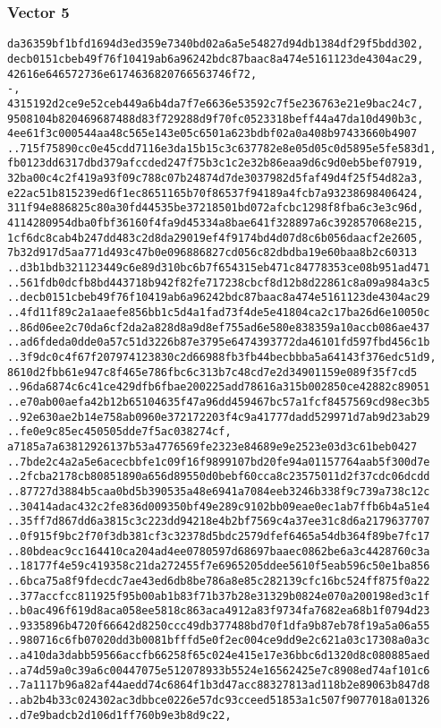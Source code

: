 \documentclass[
]{article}
\begin{document}
\hypertarget{vector-5-2}{%
\subsubsection{Vector 5}\label{vector-5-2}}

\begin{verbatim}
da36359bf1bfd1694d3ed359e7340bd02a6a5e54827d94db1384df29f5bdd302,
decb0151cbeb49f76f10419ab6a96242bdc87baac8a474e5161123de4304ac29,
42616e646572736e6174636820766563746f72,
-,
4315192d2ce9e52ceb449a6b4da7f7e6636e53592c7f5e236763e21e9bac24c7,
9508104b820469687488d83f729288d9f70fc0523318beff44a47da10d490b3c,
4ee61f3c000544aa48c565e143e05c6501a623bdbf02a0a408b97433660b4907
..715f75890cc0e45cdd7116e3da15b15c3c637782e8e05d05c0d5895e5fe583d1,
fb0123dd6317dbd379afccded247f75b3c1c2e32b86eaa9d6c9d0eb5bef07919,
32ba00c4c2f419a93f09c788c07b24874d7de3037982d5faf49d4f25f54d82a3,
e22ac51b815239ed6f1ec8651165b70f86537f94189a4fcb7a93238698406424,
311f94e886825c80a30fd44535be37218501bd072afcbc1298f8fba6c3e3c96d,
4114280954dba0fbf36160f4fa9d45334a8bae641f328897a6c392857068e215,
1cf6dc8cab4b247dd483c2d8da29019ef4f9174bd4d07d8c6b056daacf2e2605,
7b32d917d5aa771d493c47b0e096886827cd056c82dbdba19e60baa8b2c60313
..d3b1bdb321123449c6e89d310bc6b7f654315eb471c84778353ce08b951ad471
..561fdb0dcfb8bd443718b942f82fe717238cbcf8d12b8d22861c8a09a984a3c5
..decb0151cbeb49f76f10419ab6a96242bdc87baac8a474e5161123de4304ac29
..4fd11f89c2a1aaefe856bb1c5d4a1fad73f4de5e41804ca2c17ba26d6e10050c
..86d06ee2c70da6cf2da2a828d8a9d8ef755ad6e580e838359a10accb086ae437
..ad6fdeda0dde0a57c51d3226b87e3795e6474393772da46101fd597fbd456c1b
..3f9dc0c4f67f207974123830c2d66988fb3fb44becbbba5a64143f376edc51d9,
8610d2fbb61e947c8f465e786fbc6c313b7c48cd7e2d34901159e089f35f7cd5
..96da6874c6c41ce429dfb6fbae200225add78616a315b002850ce42882c89051
..e70ab00aefa42b12b65104635f47a96dd459467bc57a1fcf8457569cd98ec3b5
..92e630ae2b14e758ab0960e372172203f4c9a41777dadd529971d7ab9d23ab29
..fe0e9c85ec450505dde7f5ac038274cf,
a7185a7a63812926137b53a4776569fe2323e84689e9e2523e03d3c61beb0427
..7bde2c4a2a5e6acecbbfe1c09f16f9899107bd20fe94a01157764aab5f300d7e
..2fcba2178cb80851890a656d89550d0bebf60cca8c23575011d2f37cdc06dcdd
..87727d3884b5caa0bd5b390535a48e6941a7084eeb3246b338f9c739a738c12c
..30414adac432c2fe836d009350bf49e289c9102bb09eae0ec1ab7ffb6b4a51e4
..35ff7d867dd6a3815c3c223dd94218e4b2bf7569c4a37ee31c8d6a2179637707
..0f915f9bc2f70f3db381cf3c32378d5bdc2579dfef6465a54db364f89be7fc17
..80bdeac9cc164410ca204ad4ee0780597d68697baaec0862be6a3c4428760c3a
..18177f4e59c419358c21da272455f7e6965205ddee5610f5eab596c50e1ba856
..6bca75a8f9fdecdc7ae43ed6db8be786a8e85c282139cfc16bc524ff875f0a22
..377accfcc811925f95b00ab1b83f71b37b28e31329b0824e070a200198ed3c1f
..b0ac496f619d8aca058ee5818c863aca4912a83f9734fa7682ea68b1f0794d23
..9335896b4720f66642d8250ccc49db377488bd70f1dfa9b87eb78f19a5a06a55
..980716c6fb07020dd3b0081bfffd5e0f2ec004ce9dd9e2c621a03c17308a0a3c
..a410da3dabb59566accfb66258f65c024e415e17e36bbc6d1320d8c080885aed
..a74d59a0c39a6c00447075e512078933b5524e16562425e7c8908ed74af101c6
..7a1117b96a82af44aedd74c6864f1b3d47acc88327813ad118b2e89063b847d8
..ab2b4b33c024302ac3dbbce0226e57dc93cceed51853a1c507f9077018a01326
..d7e9badcb2d106d1ff760b9e3b8d9c22,
\end{verbatim}
\end{document}

